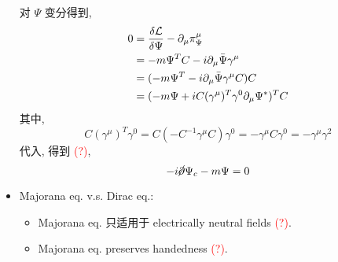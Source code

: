 \begin{itemize}
	\begin{tcolorbox}[title=calculation:]
		对 $\Psi$ 变分得到,
		\begin{align}
			0 &= \frac{\delta \mathcal{L}}{\delta \Psi} - \partial_\mu \pi_\Psi^\mu \notag \\
			&= - m \Psi^T C - i \partial_\mu \bar{\Psi} \gamma^\mu \notag \\
			&= (- m \Psi^T - i \partial_\mu \bar{\Psi} \gamma^\mu C) C \notag \\
			&= (- m \Psi + i C (\gamma^\mu)^T \gamma^0 \partial_\mu \Psi^*)^T C
		\end{align}
		其中,
		\begin{equation}
			C (\gamma^\mu)^T \gamma^0 = C (- C^{- 1} \gamma^\mu C) \gamma^0 = - \gamma^\mu C \gamma^0 = - \gamma^\mu \gamma^2
		\end{equation}
		代入, 得到 \textcolor{red}{(?)},
		\begin{equation}
			- i \cancel{\partial} \Psi_c - m \Psi = 0
		\end{equation}
	\end{tcolorbox}
	
	\item Majorana eq. v.s. Dirac eq.:
	\begin{itemize}
		\item Majorana eq. 只适用于 electrically neutral fields \textcolor{red}{(?)}.
		
		\item Majorana eq. preserves handedness \textcolor{red}{(?)}.
	\end{itemize}
\end{itemize}
